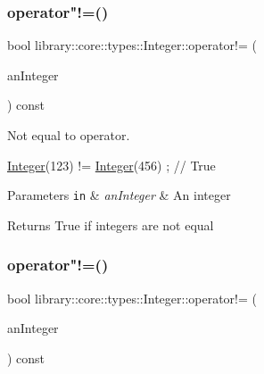 \mbox{\label{classlibrary_1_1core_1_1types_1_1_integer_a9145ffb6bca8771f06a3403056466d53}} 
\subsubsection{\texorpdfstring{operator"!=()}{operator!=()}\hspace{0.1cm}{\footnotesize\ttfamily [1/2]}}
{\footnotesize\ttfamily bool library\+::core\+::types\+::\+Integer\+::operator!= (\begin{DoxyParamCaption}\item[{const \hyperlink{classlibrary_1_1core_1_1types_1_1_integer}{Integer} \&}]{an\+Integer }\end{DoxyParamCaption}) const}



Not equal to operator. 


\begin{DoxyCode}
\hyperlink{classlibrary_1_1core_1_1types_1_1_integer_a6483b1c4e13e5ed6af5e7a58347efead}{Integer}(123) != \hyperlink{classlibrary_1_1core_1_1types_1_1_integer_a6483b1c4e13e5ed6af5e7a58347efead}{Integer}(456) ; \textcolor{comment}{// True}
\end{DoxyCode}



\begin{DoxyParams}[1]{Parameters}
\mbox{\tt in}  & {\em an\+Integer} & An integer \\
\hline
\end{DoxyParams}
\begin{DoxyReturn}{Returns}
True if integers are not equal 
\end{DoxyReturn}
\mbox{\label{classlibrary_1_1core_1_1types_1_1_integer_a9c3c4e9564a3a8da5133207f3197d3a3}} 
\subsubsection{\texorpdfstring{operator"!=()}{operator!=()}\hspace{0.1cm}{\footnotesize\ttfamily [2/2]}}
{\footnotesize\ttfamily bool library\+::core\+::types\+::\+Integer\+::operator!= (\begin{DoxyParamCaption}\item[{const \hyperlink{classlibrary_1_1core_1_1types_1_1_integer_a623afb1580f870fd8a1997b1c12c917d}{Integer\+::\+Value\+Type} \&}]{an\+Integer }\end{DoxyParamCaption}) const}

